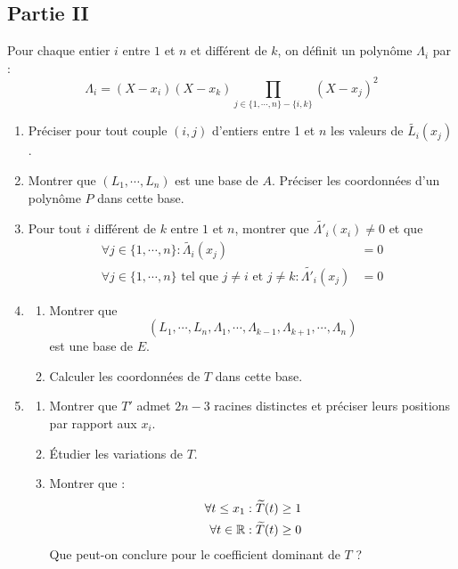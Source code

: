 \subsection*{Partie II}
Pour chaque entier $i$ entre $1$ et $n$ et différent de $k$, on définit un polynôme $\Lambda_i$  par :
\begin{displaymath}
\Lambda_i = (X-x_i)(X-x_k)\prod_{j\in\{1,\cdots,n\}-\{i,k\}}(X-x_j)^2
\end{displaymath}
\begin{enumerate}
\item Préciser pour tout couple $(i,j)$ d'entiers entre 1 et $n$ les valeurs de $\widetilde{L_i}(x_j)$.
\item Montrer que $(L_1,\cdots,L_n)$ est une base de $A$. Préciser les coordonnées d'un polynôme $P$ dans cette base.
\item Pour tout $i$ différent de $k$ entre $1$ et $n$, montrer que $\widetilde{\Lambda'_i}(x_i) \neq 0 $ et que
\begin{align*}
 \forall j\in \{1,\cdots ,n\} : \widetilde{\Lambda_i}(x_j)&=0 \\
 \forall j\in \{1,\cdots ,n\} \text{ tel que } j\neq i \text{ et } j\neq k: \widetilde{\Lambda'_i}(x_j)&=0
\end{align*}
\item \begin{enumerate}
\item Montrer que 
\begin{displaymath}
 \left( L_1,\cdots,L_n,\Lambda_1,\cdots,\Lambda_{k-1},\Lambda_{k+1},\cdots,\Lambda_n\right) 
\end{displaymath}
est une base de $E$.
\item Calculer les coordonnées de $T$ dans cette base.
\end{enumerate}
\item \begin{enumerate}
\item Montrer que $T'$ admet $2n-3$ racines distinctes et préciser leurs positions par rapport aux $x_i$.
\item {\'E}tudier les variations de $T$.
\item Montrer que :
\begin{align*}
\forall t \leq x_1 &: \widetilde{T}(t)\geq 1\\
\forall t \in \mathbb{R} &: \widetilde{T}(t)\geq 0 
\end{align*}
Que peut-on conclure pour le coefficient dominant de $T$ ?
\end{enumerate}
\end{enumerate} 
